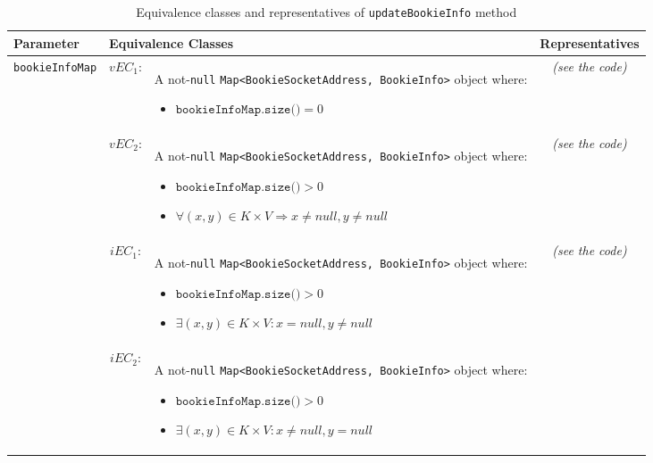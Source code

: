 \documentclass[sigconf]{acmart}
\begin{document}
\begin{table*}
\footnotesize
\caption{Equivalence classes and representatives of \texttt{updateBookieInfo} method}
\label{updateBookieInfoEq}
\centering
\begin{tabular}{l|cm{10.5cm}|c}
\toprule
 
\textbf{Parameter} & \multicolumn{2}{|l|}{\textbf{Equivalence Classes}} & \textbf{Representatives} \\
\midrule
    
\texttt{bookieInfoMap} & $vEC_1$: & A not-\texttt{null} \texttt{Map<BookieSocketAddress, BookieInfo>} object where:
	
\begin{itemize}
\item $\texttt{bookieInfoMap.size()} = 0$
\end{itemize}

& \textit{(see the code)}   
    
\\\cline{2-4}    
    
& $vEC_2$: & A not-\texttt{null} \texttt{Map<BookieSocketAddress, BookieInfo>} object where:
	
\begin{itemize}
\item $\texttt{bookieInfoMap.size()} > 0$
\item $\forall (x,y) \in K \times V \Rightarrow x \neq null, y \neq null$
\end{itemize}

& \textit{(see the code)}   
    
\\\cline{2-4}       
    
& $iEC_1$: & A not-\texttt{null} \texttt{Map<BookieSocketAddress, BookieInfo>} object where:
	
\begin{itemize}
\item $\texttt{bookieInfoMap.size()} > 0$
\item $\exists (x,y) \in K \times V : x = null, y \neq null$
\end{itemize}

& \textit{(see the code)} 

\\\cline{2-4}    
    
& $iEC_2$: & A not-\texttt{null} \texttt{Map<BookieSocketAddress, BookieInfo>} object where:
	
\begin{itemize}
\item $\texttt{bookieInfoMap.size()} > 0$
\item $\exists (x,y) \in K \times V : x \neq null, y = null$
\end{itemize}


\end{tabular}
\end{table*}
\end{document}
